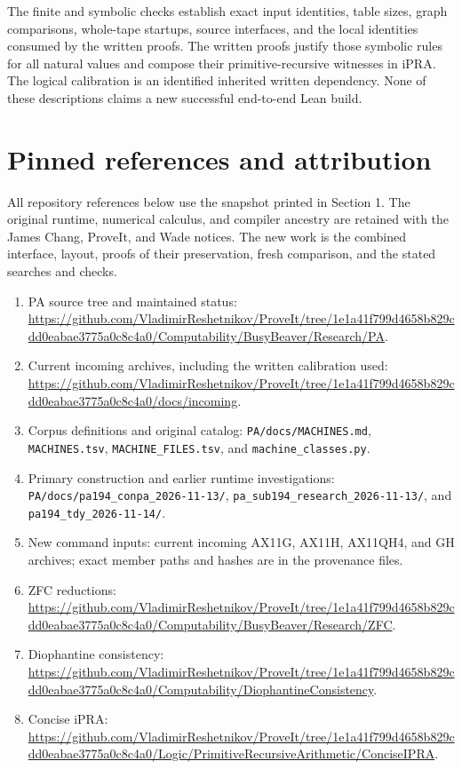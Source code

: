 \documentclass[11pt,letterpaper]{article}
\newcommand{\file}[1]{\texttt{\nolinkurl{#1}}}
\begin{document}


The finite and symbolic checks establish exact input identities, table
sizes, graph comparisons, whole-tape startups, source interfaces, and
the local identities consumed by the written proofs. The written proofs
justify those symbolic rules for all natural values and compose their
primitive-recursive witnesses in iPRA. The logical calibration is an
identified inherited written dependency. None of these descriptions
claims a new successful end-to-end Lean build.

\section{Pinned references and attribution}

All repository references below use the snapshot printed in Section 1.
The original runtime, numerical calculus, and compiler ancestry are
retained with the James Chang, ProveIt, and Wade notices. The new work is
the combined interface, layout, proofs of their preservation, fresh
comparison, and the stated searches and checks.

\begin{enumerate}
\item PA source tree and maintained status:
\url{https://github.com/VladimirReshetnikov/ProveIt/tree/1e1a41f799d4658b829cdd0eabae3775a0c8c4a0/Computability/BusyBeaver/Research/PA}.
\item Current incoming archives, including the written calibration used:
\url{https://github.com/VladimirReshetnikov/ProveIt/tree/1e1a41f799d4658b829cdd0eabae3775a0c8c4a0/docs/incoming}.
\item Corpus definitions and original catalog:
\file{PA/docs/MACHINES.md}, \file{MACHINES.tsv},
\file{MACHINE_FILES.tsv}, and \file{machine_classes.py}.
\item Primary construction and earlier runtime investigations:
\file{PA/docs/pa194_conpa_2026-11-13/},
\file{pa_sub194_research_2026-11-13/},
and \file{pa194_tdy_2026-11-14/}.
\item New command inputs: current incoming AX11G, AX11H, AX11QH4,
and GH archives; exact member paths and hashes are in the provenance files.
\item ZFC reductions:
\url{https://github.com/VladimirReshetnikov/ProveIt/tree/1e1a41f799d4658b829cdd0eabae3775a0c8c4a0/Computability/BusyBeaver/Research/ZFC}.
\item Diophantine consistency:
\url{https://github.com/VladimirReshetnikov/ProveIt/tree/1e1a41f799d4658b829cdd0eabae3775a0c8c4a0/Computability/DiophantineConsistency}.
\item Concise iPRA:
\url{https://github.com/VladimirReshetnikov/ProveIt/tree/1e1a41f799d4658b829cdd0eabae3775a0c8c4a0/Logic/PrimitiveRecursiveArithmetic/ConciseIPRA}.
\end{enumerate}
\end{document}
